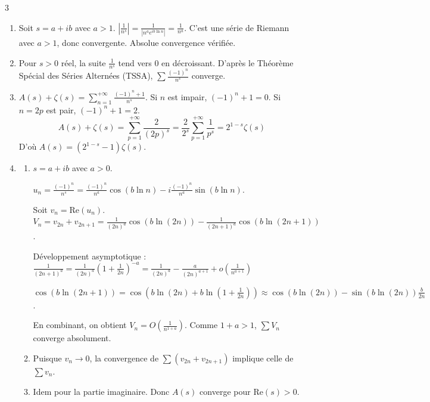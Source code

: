 \begin{correction}{3}
\begin{enumerate}
    \item
        Soit $s=a+ib$ avec $a>1$.
        $|\frac{1}{n^s}| = \frac{1}{|n^a e^{ib\ln n}|} = \frac{1}{n^a}$.
        C'est une série de Riemann avec $a>1$, donc convergente. Absolue convergence vérifiée.

    \item 
        Pour $s>0$ réel, la suite $\frac{1}{n^s}$ tend vers 0 en décroissant.
        D'après le Théorème Spécial des Séries Alternées (TSSA), $\sum \frac{(-1)^n}{n^s}$ converge.

    \item 
        $A(s)+\zeta(s) = \sum_{n=1}^{+ \infty} \frac{(-1)^n+1}{n^s}$.
        Si $n$ est impair, $(-1)^n+1=0$. Si $n=2p$ est pair, $(-1)^n+1=2$.
        $$ A(s)+\zeta(s) = \sum_{p=1}^{+ \infty} \frac{2}{(2p)^s} = \frac{2}{2^s} \sum_{p=1}^{+ \infty} \frac{1}{p^s} = 2^{1-s} \zeta(s) $$
        D'où $A(s) = (2^{1-s}-1)\zeta(s)$.

    \item
    \begin{enumerate}
        \item $s=a+ib$ avec $a>0$.
        
            $u_n = \frac{(-1)^n}{n^s} = \frac{(-1)^n}{n^a} \cos(b\ln n) - i \frac{(-1)^n}{n^a} \sin(b\ln n)$.

            Soit $v_n = \text{Re}(u_n)$.
            $V_n = v_{2n} + v_{2n+1} = \frac{1}{(2n)^a}\cos(b\ln(2n)) - \frac{1}{(2n+1)^a}\cos(b\ln(2n+1))$.

            Développement asymptotique :
            $\frac{1}{(2n+1)^a} = \frac{1}{(2n)^a}(1+\frac{1}{2n})^{-a} = \frac{1}{(2n)^a} - \frac{a}{(2n)^{a+1}} + o(\frac{1}{n^{a+1}})$
            
            $\cos(b\ln(2n+1)) = \cos(b\ln(2n) + b\ln(1+\frac{1}{2n})) \approx \cos(b\ln(2n)) - \sin(b\ln(2n))\frac{b}{2n}$.
            
            En combinant, on obtient $V_n = O(\frac{1}{n^{1+a}})$.
            Comme $1+a > 1$, $\sum V_n$ converge absolument.

        \item 
            Puisque $v_n \to 0$, la convergence de $\sum (v_{2n}+v_{2n+1})$ implique celle de $\sum v_n$.

        \item
            Idem pour la partie imaginaire. Donc $A(s)$ converge pour $\text{Re}(s)>0$.
    \end{enumerate}
\end{enumerate}
\end{correction}

